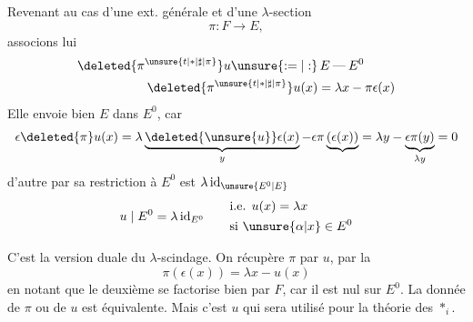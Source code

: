 Revenant au cas d'une ext. générale
et d'une $\lambda$-section
\[
\pi:F\longrightarrow E,
\]
associons lui
\[
\begin{aligned}
\deleted{\pi^{\unsure{t|*|\sharp|\pi}}}u\unsure{:=|:}&\,E\mathbin{\text{---}}E^0\\
\deleted{\pi^{\unsure{t|*|\sharp|\pi}}}u(x)&=\lambda x-\pi\epsilon(x)
\end{aligned}
\]
Elle envoie bien $E$ dans $E^0$, car
\[
\epsilon\deleted{\pi}u(x)=\lambda\underbrace{\deleted{\unsure{u}}\epsilon(x)}_y-
\epsilon\pi\underbrace{(\epsilon(x))}=\lambda y-\underbrace{\epsilon\pi(y)}_{\lambda y}=0
\]
d'autre par sa restriction à $E^0$ est $\lambda\,\mathrm{id}_{\unsure{E^0|E}}$
\[
u\mid E^0=\lambda\,\mathrm{id}_{E^0}\qquad
\begin{aligned}&\text{i.e. }u(x)=\lambda x\\&\text{si }\unsure{\alpha|x}\in E^0\end{aligned}
\]

C'est la version duale du $\lambda$-scindage.
On récupère $\pi$ par $u$, par la
\[
\pi(\epsilon(x))=\lambda x-u(x)
\]
en notant que le deuxième  se
factorise bien par $F$, car il est nul
sur $E^0$. La donnée de $\pi$ ou de $u$
est équivalente. Mais c'est $u$ qui
sera utilisé pour la théorie des $*_{i}$.
